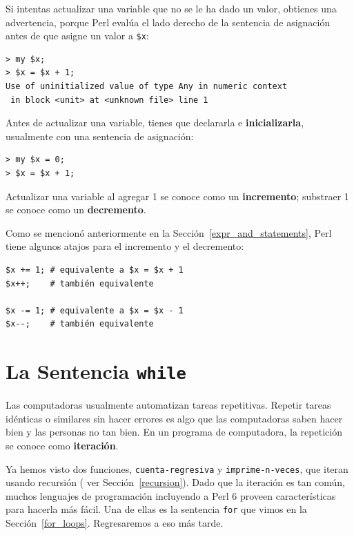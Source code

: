Si intentas actualizar una variable que no se le ha dado un valor,
obtienes una advertencia, porque Perl evalúa el lado derecho de la 
sentencia de asignación antes de que asigne un valor a {\tt \$x}:

\begin{verbatim}
> my $x;
> $x = $x + 1;
Use of uninitialized value of type Any in numeric context 
 in block <unit> at <unknown file> line 1
\end{verbatim}
%
Antes de actualizar una variable, tienes que declararla 
e {\bf inicializarla}, usualmente con una sentencia de asignación:

\begin{verbatim}
> my $x = 0;
> $x = $x + 1;
\end{verbatim}
%
Actualizar una variable al agregar 1 se conoce como un {\bf incremento};
substraer 1 se conoce como un {\bf decremento}.

Como se mencionó anteriormente en la Sección~\ref{expr_and_statements},
Perl tiene algunos atajos para el incremento y el decremento:

\begin{verbatim}
$x += 1; # equivalente a $x = $x + 1
$x++;    # también equivalente 

$x -= 1; # equivalente a $x = $x - 1
$x--;    # también equivalente 
\end{verbatim}

\section{La Sentencia {\tt while}}

Las computadoras usualmente automatizan tareas repetitivas.
Repetir tareas idénticas o similares sin hacer errores es algo que las computadoras saben hacer bien y las personas
no tan bien. En un programa de computadora, la repetición se
conoce como {\bf iteración}.

Ya hemos visto dos funciones, {\tt cuenta-regresiva} 
y \verb|imprime-n-veces|, que iteran usando recursión (
ver Sección~\ref{recursion}). Dado que la iteración es tan
común, muchos lenguajes de programación incluyendo a Perl 6
proveen características para hacerla más fácil. Una de ellas es la sentencia {\tt for} que vimos en la Sección~\ref{for_loops}. Regresaremos a eso más tarde.

